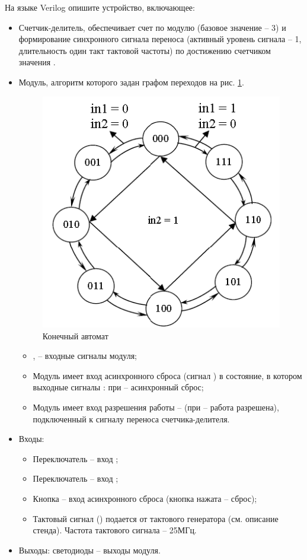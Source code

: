 На языке Verilog опишите устройство, включающее:
\begin{itemize}
	\item Счетчик-делитель, обеспечивает счет по модулю  (базовое значение -- 3) и формирование синхронного сигнала переноса (активный уровень сигнала -- 1, длительность один такт тактовой частоты) по достижению счетчиком значения .
	\item Модуль, алгоритм которого задан графом переходов на рис. \ref{fig:lab5_2_0}.
		\vspace{-0.5cm}
		\begin{figure}[H]
		\begin{center}
			\includegraphics[scale=0.7]{lab5_2_0}
			\caption{Конечный автомат}
			\label{fig:lab5_2_0}
		\end{center}
		\end{figure}
		\vspace{-1cm}
		\begin{itemize}
			\item {},  -- входные сигналы модуля;
			\item Модуль имеет вход асинхронного сброса (сигнал ) в состояние, в котором выходные сигналы : при  -- асинхронный сброс;
			\item Модуль имеет вход разрешения работы --  (при  -- работа разрешена), подключенный к сигналу переноса счетчика-делителя.
		\end{itemize}
	\item Входы:
		\begin{itemize}
			\item Переключатель  -- вход ;
			\item Переключатель  – вход ;
			\item Кнопка  – вход асинхронного сброса (кнопка нажата – сброс);
			\item Тактовый сигнал () подается от тактового генератора (см. описание стенда). Частота тактового сигнала – 25МГц.
		\end{itemize}
	\item Выходы: светодиоды  -- выходы модуля.
\end{itemize}
